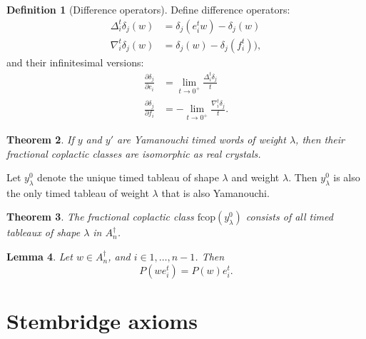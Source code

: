 \documentclass[12pt]{amsproc}
\newcommand{\fcop}{\mathrm{fcop}}
\newtheorem{theorem}{Theorem}
\newtheorem{lemma}[theorem]{Lemma}
\theoremstyle{definition}
\newtheorem{definition}[theorem]{Definition}
\begin{document}
\begin{definition}
  [Difference operators]
  Define difference operators:
  \begin{align*}
    \Delta_i^t\delta_j(w) & = \delta_j(e_i^tw)-\delta_j(w)\\
    \nabla_i^t\delta_j(w) & = \delta_j(w)-\delta_j(f_i^t)),
  \end{align*}
  and their infinitesimal versions:
  \begin{align*}
    \frac{\partial\delta_j}{\partial e_i} &= \lim_{t\to 0^+}\frac{\Delta_i^t\delta_j}t\\
    \frac{\partial\delta_j}{\partial f_i} &= -\lim_{t\to 0^+}\frac{\nabla_i^t\delta_j}t.
  \end{align*}
\end{definition}
\begin{theorem}
  If $y$ and $y'$ are Yamanouchi timed words of weight $\lambda$, then their fractional coplactic classes are isomorphic as real crystals.
\end{theorem}
Let $y^0_\lambda$ denote the unique timed tableau of shape $\lambda$ and weight $\lambda$.
Then $y^0_\lambda$ is also the only timed tableau of weight $\lambda$ that is also Yamanouchi.
\begin{theorem}
  The fractional coplactic class $\fcop(y^0_\lambda)$ consists of all timed tableaux of shape $\lambda$ in $A_n^\dagger$.
\end{theorem}
\begin{lemma}
  Let $w\in A_n^\dagger$, and $i\in 1,\dotsc, n-1$.
  Then
  \begin{displaymath}
    P(w e_i^t) = P(w) e_i^t.
  \end{displaymath}
\end{lemma}

\section{Stembridge axioms}
\label{sec:stembridge-axioms}
\end{document}
